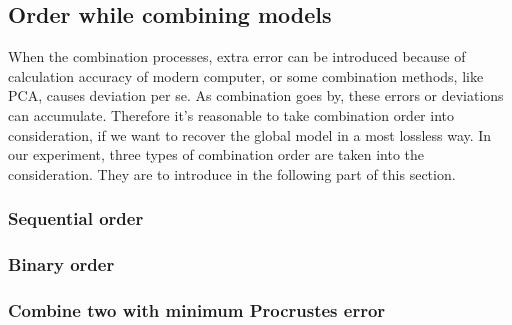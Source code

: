 \subsection{Order while combining models}
  When the combination processes, extra error can be introduced because of calculation accuracy of modern computer, or some combination methods, like PCA, causes deviation per se. As combination goes by, these errors or deviations can accumulate. Therefore it's reasonable to take combination order into consideration, if we want to recover the global model in a most lossless way. In our experiment, three types of combination order are taken into the consideration. They are to introduce in the following part of this section.
  \subsubsection{Sequential order}
  \subsubsection{Binary order}
  \subsubsection{Combine two with minimum Procrustes error}
